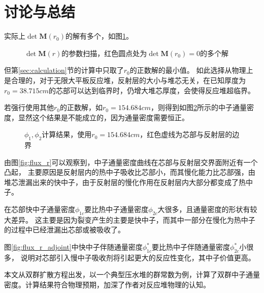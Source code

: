\section{讨论与总结}
\label{sec:discussion}

实际上$\det \pmb{M}(r_0)$的解有多个，如图\ref{fig:det_M_r_far}。

\begin{figure}[H]
    \centering
    
    \caption{$\det \pmb{M}(r)$的参数扫描，红色圆点处为$\det \pmb{M}(r_0)=0$的多个解}
    \label{fig:det_M_r_far}
\end{figure}

但第\ref{sec:calculation}节的计算中只取了$r_0$的正数解的最小值。
如此选择从物理上是合理的，对于无限大平板反应堆，反射层的大小与堆芯无关，在已知厚度为$r_0=38.715\si{cm}$的芯部可以达到临界时，仍增大堆芯厚度，会使得反应堆超临界。

若强行使用其他$r_0$的正数解，如$r_0=154.684\si{cm}$，则得到如图\ref{fig:flux_r_far}所示的中子通量密度，显然这个结果是不能成立的，因为通量密度需要恒正。

\begin{figure}[H]
    \centering
    
    \caption{$\phi_1,\phi_2$计算结果，使用$r_0=154.684\si{cm}$，红色虚线为芯部与反射层的边界}
    \label{fig:flux_r_far}
\end{figure}

由图\ref{fig:flux_r}可以观察到，中子通量密度曲线在芯部与反射层交界面附近有一个凸起，
主要原因是反射层内的热中子吸收比芯部小，而其慢化能力比芯部强，由堆芯泄漏出来的快中子，由于反射层的慢化作用在反射层内大部分都变成了热中子。

在芯部快中子通量密度$\phi_{1c}$要比热中子通量密度$\phi_{2c}$大很多，且通量密度的形状有较大差异。
这主要是因为裂变产生的主要是快中子，而其中一部分在慢化为热中子的过程中已经泄漏出芯部或被吸收了。

图\ref{fig:flux_r_adjoint}中快中子伴随通量密度$\phi^*_{1c}$要比热中子伴随通量密度$\phi^*_{2c}$小很多，
说明对芯部引入慢中子吸收剂将引起更大的反应性变化，其中子价值更高。

本文从双群扩散方程出发，以一个典型压水堆的群常数为例，计算了双群中子通量密度。计算结果符合物理预期，加深了作者对反应堆物理的认知。
